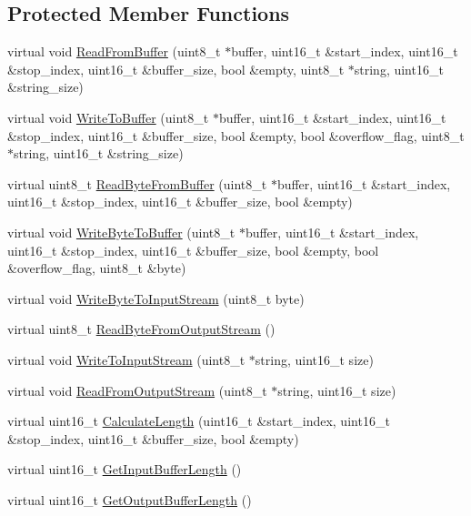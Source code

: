 \subsection*{Protected Member Functions}
\begin{DoxyCompactItemize}
\item 
virtual void \hyperlink{class_stream_a764fe1523ec7aadf6bd0206ebeeeb966}{Read\-From\-Buffer} (uint8\-\_\-t $\ast$buffer, uint16\-\_\-t \&start\-\_\-index, uint16\-\_\-t \&stop\-\_\-index, uint16\-\_\-t \&buffer\-\_\-size, bool \&empty, uint8\-\_\-t $\ast$string, uint16\-\_\-t \&string\-\_\-size)
\item 
virtual void \hyperlink{class_stream_a169dfecda6018bbe74b04e051f6d6d6d}{Write\-To\-Buffer} (uint8\-\_\-t $\ast$buffer, uint16\-\_\-t \&start\-\_\-index, uint16\-\_\-t \&stop\-\_\-index, uint16\-\_\-t \&buffer\-\_\-size, bool \&empty, bool \&overflow\-\_\-flag, uint8\-\_\-t $\ast$string, uint16\-\_\-t \&string\-\_\-size)
\item 
virtual uint8\-\_\-t \hyperlink{class_stream_a238d43e6b0b6968f5cc781da2a1aa60c}{Read\-Byte\-From\-Buffer} (uint8\-\_\-t $\ast$buffer, uint16\-\_\-t \&start\-\_\-index, uint16\-\_\-t \&stop\-\_\-index, uint16\-\_\-t \&buffer\-\_\-size, bool \&empty)
\item 
virtual void \hyperlink{class_stream_a06af5437ca096ddc331bdce168ea4085}{Write\-Byte\-To\-Buffer} (uint8\-\_\-t $\ast$buffer, uint16\-\_\-t \&start\-\_\-index, uint16\-\_\-t \&stop\-\_\-index, uint16\-\_\-t \&buffer\-\_\-size, bool \&empty, bool \&overflow\-\_\-flag, uint8\-\_\-t \&byte)
\item 
virtual void \hyperlink{class_stream_a70108ab0e811c6cab2636bf7afeb5e14}{Write\-Byte\-To\-Input\-Stream} (uint8\-\_\-t byte)
\item 
virtual uint8\-\_\-t \hyperlink{class_stream_a712a8e0c6659799b1bb2999b53bd983d}{Read\-Byte\-From\-Output\-Stream} ()
\item 
virtual void \hyperlink{class_stream_aa2f020721d273ce821ccf626e5eb773c}{Write\-To\-Input\-Stream} (uint8\-\_\-t $\ast$string, uint16\-\_\-t size)
\item 
virtual void \hyperlink{class_stream_adce437b86a098710237ac7dcccd5508d}{Read\-From\-Output\-Stream} (uint8\-\_\-t $\ast$string, uint16\-\_\-t size)
\item 
virtual uint16\-\_\-t \hyperlink{class_stream_a8047b62e7dcfe0e50210b3e40c7aa6eb}{Calculate\-Length} (uint16\-\_\-t \&start\-\_\-index, uint16\-\_\-t \&stop\-\_\-index, uint16\-\_\-t \&buffer\-\_\-size, bool \&empty)
\item 
virtual uint16\-\_\-t \hyperlink{class_stream_a4860b9602c68ab437520d321e4e97212}{Get\-Input\-Buffer\-Length} ()
\item 
virtual uint16\-\_\-t \hyperlink{class_stream_ad8aea9131dbc1b422bdba2408d63492a}{Get\-Output\-Buffer\-Length} ()
\end{DoxyCompactItemize}

